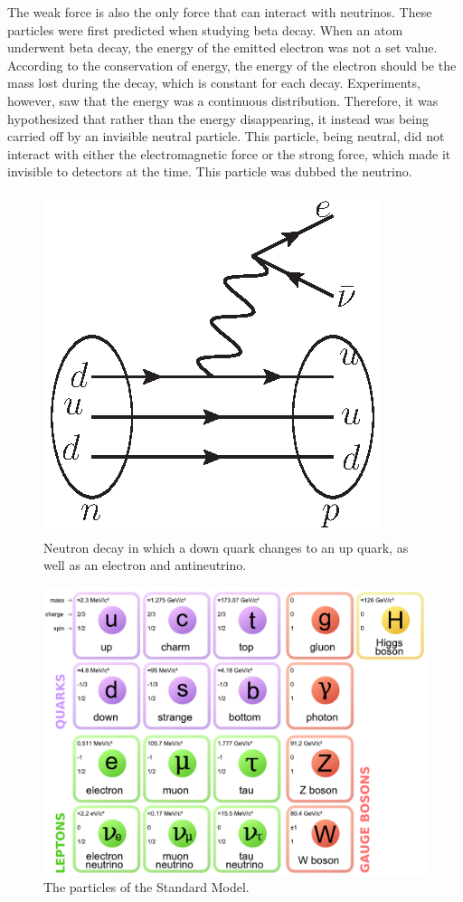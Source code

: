     The weak force is also the only force that can interact with neutrinos. These particles were first predicted when studying beta decay. When an atom underwent beta decay, the energy of the emitted electron was not a set value. According to the conservation of energy, the energy of the electron should be the mass lost during the decay, which is constant for each decay. Experiments, however, saw that the energy was a continuous distribution. Therefore, it was hypothesized that rather than the energy disappearing, it instead was being carried off by an invisible neutral particle. This particle, being neutral, did not interact with either the electromagnetic force or the strong force, which made it invisible to detectors at the time. This particle was dubbed the neutrino.
    
    \begin{figure}[!htbp]
    \centering
    \includegraphics[width=.4\textwidth]{figures/NeutronDecay.eps}
    \caption[
        The particles of the Standard Model.
    ]{
Neutron decay in which a down quark changes to an up quark, as well as an electron and antineutrino.
    }
    \label{fig:NeutronDecay}
\end{figure}
 

 
 


  
 
 
 \begin{figure}[!htbp]
    \centering
    \includegraphics[width=\textwidth]{figures/standard_model.pdf}
    \caption[
        The particles of the Standard Model.
    ]{
      The particles of the Standard Model.
    }
    \label{fig:ParticleTable}
\end{figure}
 

